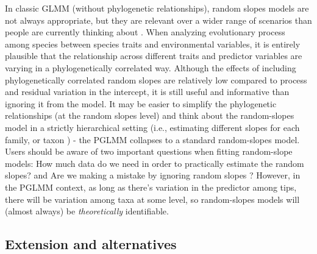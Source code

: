 In classic GLMM (without phylogenetic relationships), random slopes models are not always appropriate, but they are relevant over a wider range of scenarios than people are currently thinking about \cite{schielzeth2008conclusions, cleasby2015quantifying}.
When analyzing evolutionary process among species between species traits and environmental variables, it is entirely plausible that the relationship across different traits and predictor variables are varying in a phylogenetically correlated way.
Although the effects of including phylogenetically correlated random slopes are relatively low compared to process and residual variation in the intercept, it is still useful and informative than ignoring it from the model.
It may be easier to simplify the phylogenetic relationships (at the random slopes level) and think about the random-slopes model in a strictly hierarchical setting (i.e., estimating different slopes for each family, or taxon \cite{bunnefeld2012island}) - the PGLMM collapses to a standard random-slopes model. 
Users should be aware of two important questions when fitting random-slope models: How much data do we need in order to practically estimate the random slopes? and Are we making a mistake by ignoring random slopes \cite{schielzeth2008conclusions}? 
However, in the PGLMM context, as long as there's variation in the predictor among tips, there will be variation among taxa at some level, so random-slopes models will (almost always) be \emph{theoretically} identifiable.


\subsection{Extension and alternatives}

